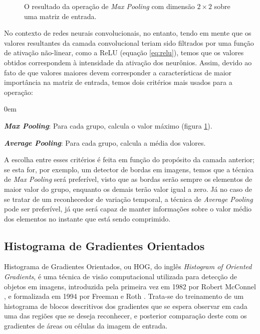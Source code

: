 \begin{figure}[ht]
    \centering
    
    \caption{O resultado da operação de \textit{Max Pooling} com dimensão $2\times2$ sobre uma matriz de entrada.}
    \label{fig:maxpool}
\end{figure}

No contexto de redes neurais convolucionais, no entanto, tendo em mente que os valores resultantes da camada convolucional teriam sido filtrados por uma função de ativação não-linear, como a ReLU (equação \ref{eq:relu}), temos que os valores obtidos correspondem à intensidade da ativação dos neurônios.
Assim, devido ao fato de que valores maiores devem corresponder a características de maior importância na matriz de entrada, temos dois critérios mais usados para a operação:

\begin{description}
    \itemsep0em 
    \item \textit{\textbf{Max Pooling}}: Para cada grupo, calcula o valor máximo (figura \ref{fig:maxpool}).
    \item \textit{\textbf{Average Pooling}}: Para cada grupo, calcula a média dos valores.
\end{description}

A escolha entre esses critérios é feita em função do propósito da camada anterior; se esta for, por exemplo, um detector de bordas em imagens, temos que a técnica de \textit{Max Pooling} será preferível, visto que as bordas serão sempre os elementos de maior valor do grupo, enquanto os demais terão valor igual a zero.
Já no caso de se tratar de um reconhecedor de variação temporal, a técnica de \textit{Average Pooling} pode ser preferível, já que será capaz de manter informações sobre o valor médio dos elementos no instante que está sendo comprimido.

\subsection{Histograma de Gradientes Orientados}
\label{sec:facialrecog}

Histograma de Gradientes Orientados, ou HOG, do inglês \textit{Histogram of Oriented Gradients}, é uma técnica de visão computacional utilizada para detecção de objetos em imagens, introduzida pela primeira vez em 1982 por Robert McConnel \cite{mcconnellMethodApparatusPattern1986}, e formalizada em 1994 por Freeman e Roth \cite{freemanOrientationHistogramsHand}.
Trata-se do treinamento de um histograma de blocos descritivos dos gradientes que se espera observar em cada uma das regiões que se deseja reconhecer, e posterior comparação deste com os gradientes de áreas ou células da imagem de entrada.

